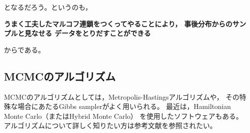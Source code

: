 \documentclass[11pt,uplatex]{jsarticle}
\begin{document}
\noindent
となるだろう。というのも，

\vspace{2zw}
\hspace{10mm}
\begin{minipage}{110mm}
\begin{breakbox}
\noindent
{\large\bf うまく工夫したマルコフ連鎖をつくってやることにより，
事後分布からのサンプルと見なせる
データをとりだすことができる}
\end{breakbox}
\end{minipage}
\vspace{2zw}

\noindent
からである。


\subsection{MCMCのアルゴリズム}

MCMCのアルゴリズムとしては，Metropolis-Hastingsアルゴリズムや，
その特殊な場合にあたるGibbs samplerがよく用いられる。\cite{PRML,Iba2005,Toyoda,Watanabe}
最近は，Hamiltonian Monte Carlo（またはHybrid Monte Carlo）
\cite{PRML,BDA3,Toyoda2015,Watanabe}
を使用したソフトウェアもある。
アルゴリズムについて詳しく知りたい方は参考文献を参照されたい。
\end{document}
